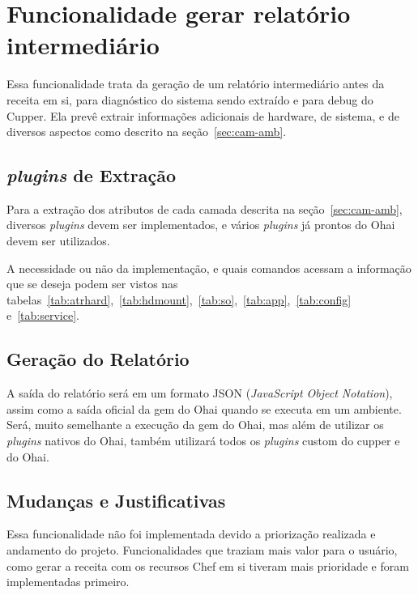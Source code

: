 \section{Funcionalidade gerar relatório intermediário}
\label{sec:rel}

Essa funcionalidade trata da geração de um relatório intermediário antes da 
receita em si, para diagnóstico do sistema sendo extraído e para debug do 
Cupper. Ela prevê extrair informações adicionais de hardware, de sistema, e de
diversos aspectos como descrito na seção~\ref{sec:cam-amb}.

\subsection{\textit{plugins} de Extração}
Para a extração dos atributos de cada camada descrita na seção~\ref{sec:cam-amb},
diversos \textit{plugins} devem ser implementados, e vários \textit{plugins} já prontos do Ohai
devem ser utilizados.

A necessidade ou não da implementação, e quais comandos acessam a informação 
que se deseja podem ser vistos nas tabelas~\ref{tab:atrhard},~\ref{tab:hdmount},~\ref{tab:so},~\ref{tab:app},~\ref{tab:config} e~\ref{tab:service}.

\subsection{Geração do Relatório}
A saída do relatório será em um formato JSON (\textit{JavaScript Object Notation}),
assim como a saída oficial da gem do Ohai quando se executa em um ambiente. Será,
muito semelhante a execução da gem do Ohai, mas além de utilizar os \textit{plugins} nativos
do Ohai, também utilizará todos os \textit{plugins} custom do cupper e do Ohai.

\subsection{Mudanças e Justificativas}
Essa funcionalidade não foi implementada devido a priorização realizada e andamento
do projeto. Funcionalidades que traziam mais valor para o usuário, como 
gerar a receita com os recursos Chef em si tiveram mais prioridade e foram implementadas
primeiro.
